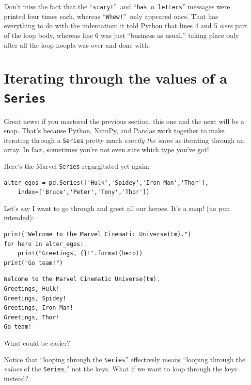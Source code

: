 Don't miss the fact that the ``\texttt{scary!}''~and ``\texttt{has $n$
letters}'' messages were printed four times each, whereas
``\texttt{Whew!}''~only appeared once. That has everything to do with the
indentation: it told Python that lines 4 and 5 \textit{were} part of the loop
body, whereas line 6 was just ``business as usual,'' taking place only after
all the loop hoopla was over and done with.

\section{Iterating through the values of a \texttt{Series}}


Great news: if you mastered the previous section, this one and the next will be
a snap. That's because Python, NumPy, and Pandas work together to make
iterating through a \texttt{Series} pretty much \textit{exactly the same} as
iterating through an array. In fact, sometimes you're not even sure which type
you've got!


Here's the Marvel \texttt{Series} regurgitated yet again:

\begin{Verbatim}[fontsize=\small,samepage=true,frame=single,framesep=3mm]
alter_egos = pd.Series(['Hulk','Spidey','Iron Man','Thor'],
    index=['Bruce','Peter','Tony','Thor'])
\end{Verbatim}


Let's say I want to go through and greet all our heroes. It's a snap! (no pun
intended):

\begin{Verbatim}[fontsize=\small,samepage=true,frame=single,framesep=3mm]
print("Welcome to the Marvel Cinematic Universe(tm).")
for hero in alter_egos:
    print("Greetings, {}!".format(hero))
print("Go team!")
\end{Verbatim}

\begin{Verbatim}[fontsize=\small,samepage=true,frame=leftline,framesep=5mm,framerule=1mm]
Welcome to the Marvel Cinematic Universe(tm).
Greetings, Hulk!
Greetings, Spidey!
Greetings, Iron Man!
Greetings, Thor!
Go team!
\end{Verbatim}

What could be easier?

Notice that ``looping through the \texttt{Series}'' effectively means ``looping
through the \textit{values} of the \texttt{Series},'' not the keys. What if we
want to loop through the keys instead?

